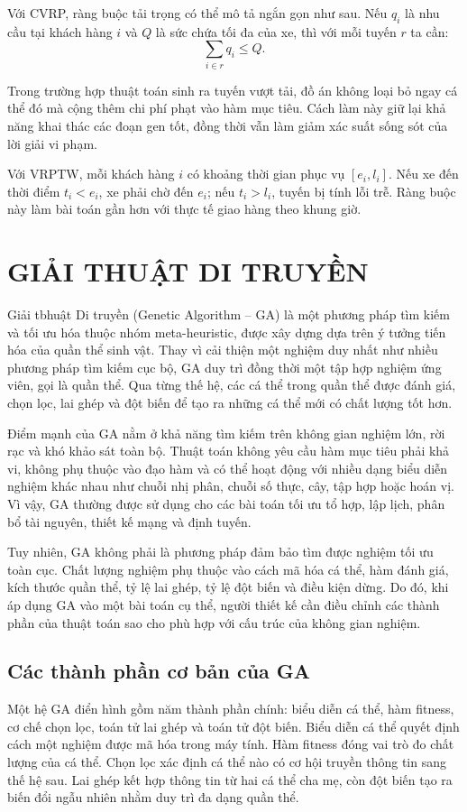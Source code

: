 \documentclass[12pt,a4paper]{article}
\numberwithin{figure}{subsection}
\numberwithin{table}{subsection}
\renewcommand{\leq}{\leqslant}
\begin{document}
Với CVRP, ràng buộc tải trọng có thể mô tả ngắn gọn như sau. Nếu $q_i$ là nhu cầu tại khách hàng $i$ và $Q$ là sức chứa tối đa của xe, thì với mỗi tuyến $r$ ta cần:
\[
    \sum_{i \in r} q_i \leq Q.
\]

Trong trường hợp thuật toán sinh ra tuyến vượt tải, đồ án không loại bỏ ngay cá thể đó mà cộng thêm chi phí phạt vào hàm mục tiêu. Cách làm này giữ lại khả năng khai thác các đoạn gen tốt, đồng thời vẫn làm giảm xác suất sống sót của lời giải vi phạm.

Với VRPTW, mỗi khách hàng $i$ có khoảng thời gian phục vụ $[e_i,l_i]$. Nếu xe đến thời điểm $t_i < e_i$, xe phải chờ đến $e_i$; nếu $t_i > l_i$, tuyến bị tính lỗi trễ. Ràng buộc này làm bài toán gần hơn với thực tế giao hàng theo khung giờ.


\section{GIẢI THUẬT DI TRUYỀN}

Giải tbhuật Di truyền (Genetic Algorithm -- GA) là một phương pháp tìm kiếm và tối ưu hóa thuộc nhóm meta-heuristic, được xây dựng dựa trên ý tưởng tiến hóa của quần thể sinh vật. Thay vì cải thiện một nghiệm duy nhất như nhiều phương pháp tìm kiếm cục bộ, GA duy trì đồng thời một tập hợp nghiệm ứng viên, gọi là quần thể. Qua từng thế hệ, các cá thể trong quần thể được đánh giá, chọn lọc, lai ghép và đột biến để tạo ra những cá thể mới có chất lượng tốt hơn.

Điểm mạnh của GA nằm ở khả năng tìm kiếm trên không gian nghiệm lớn, rời rạc và khó khảo sát toàn bộ. Thuật toán không yêu cầu hàm mục tiêu phải khả vi, không phụ thuộc vào đạo hàm và có thể hoạt động với nhiều dạng biểu diễn nghiệm khác nhau như chuỗi nhị phân, chuỗi số thực, cây, tập hợp hoặc hoán vị. Vì vậy, GA thường được sử dụng cho các bài toán tối ưu tổ hợp, lập lịch, phân bổ tài nguyên, thiết kế mạng và định tuyến.

Tuy nhiên, GA không phải là phương pháp đảm bảo tìm được nghiệm tối ưu toàn cục. Chất lượng nghiệm phụ thuộc vào cách mã hóa cá thể, hàm đánh giá, kích thước quần thể, tỷ lệ lai ghép, tỷ lệ đột biến và điều kiện dừng. Do đó, khi áp dụng GA vào một bài toán cụ thể, người thiết kế cần điều chỉnh các thành phần của thuật toán sao cho phù hợp với cấu trúc của không gian nghiệm.

\subsection{Các thành phần cơ bản của GA}
Một hệ GA điển hình gồm năm thành phần chính: biểu diễn cá thể, hàm fitness, cơ chế chọn lọc, toán tử lai ghép và toán tử đột biến. Biểu diễn cá thể quyết định cách một nghiệm được mã hóa trong máy tính. Hàm fitness đóng vai trò đo chất lượng của cá thể. Chọn lọc xác định cá thể nào có cơ hội truyền thông tin sang thế hệ sau. Lai ghép kết hợp thông tin từ hai cá thể cha mẹ, còn đột biến tạo ra biến đổi ngẫu nhiên nhằm duy trì đa dạng quần thể.
\end{document}

